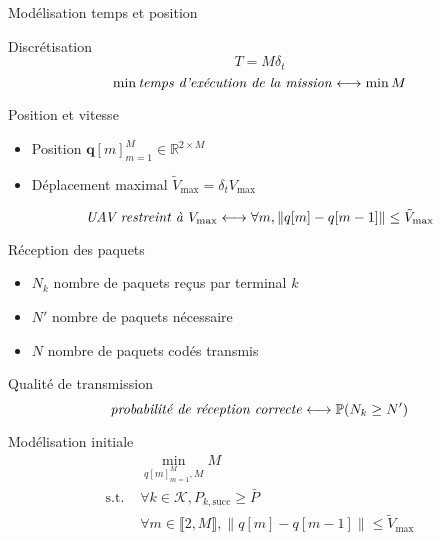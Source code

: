 \begin{frame}{Modélisation temps et position}
  \begin{block}{Discrétisation}
    \[ T = M \delta_t \]
    \begin{equation}
      \min \text{\textit{temps d'exécution de la mission}}
      \longleftrightarrow \min M
    \end{equation}
  \end{block}
  \begin{block}{Position et vitesse}
    \begin{itemize}
    \item Position \( \mathbf{q}[m]_{m = 1}^M \in \mathbb{R}^{2 \times
      M} \)
    \item Déplacement maximal \( \tilde{V}_{\text{max}} = \delta_t
      V_{\text{max}} \)
    \end{itemize}
    \begin{equation}
      \text{\textit{UAV restreint à} } V_{\text{max}} \longleftrightarrow
      \forall m, \| q[m] - q[m - 1] \| \leq \tilde{V}_{\text{max}}
    \end{equation}
  \end{block}
\end{frame}
\begin{frame}{Réception des paquets}
  \begin{itemize}
  \item \( N_k \) nombre de paquets reçus par terminal \( k \)
  \item \( N' \) nombre de paquets nécessaire
  \item \( N \) nombre de paquets codés transmis
  \end{itemize}
  \begin{block}{Qualité de transmission}
    \begin{equation}
      \text{\textit{probabilité de réception correcte}} \longleftrightarrow
      \mathbb{P}(N_k \geq N')
    \end{equation}
  \end{block}
\end{frame}
\begin{frame}{Modélisation initiale}
  \begin{align}
      & \min_{q[m]_{m=1}^M, M} M \tag{P1} \label{eq:init-obj} \\
      \text{s.t. } & \forall k \in \mathcal{K}, P_{k, \text{succ}}
      \geq \bar{P} \label{eq:init-prec} \\
      & \forall m \in \llbracket 2, M \rrbracket, \| q[m] - q[m - 1]
      \| \leq \tilde{V}_{\text{max}}
  \end{align}
\end{frame}

